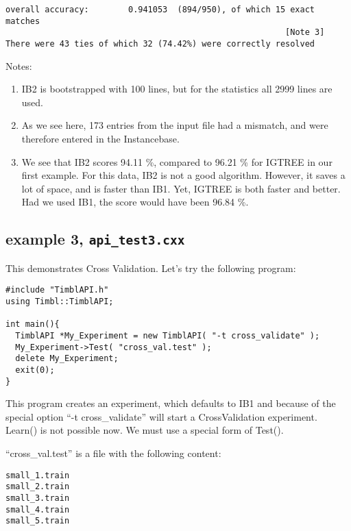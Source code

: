 \documentclass{report}
\begin{document}
\begin{footnotesize}
\begin{verbatim}
overall accuracy:        0.941053  (894/950), of which 15 exact matches 
                                                         [Note 3]
There were 43 ties of which 32 (74.42%) were correctly resolved
\end{verbatim}
\end{footnotesize}


Notes:
\begin{enumerate}
\item IB2 is bootstrapped with 100 lines, but for the statistics all 2999
 lines are used.
\item As we see here, 173 entries from the input file had a mismatch,
and were therefore entered in the Instancebase.
\item We see that IB2 scores 94.11 \%, compared to 96.21 \% for IGTREE
  in our first example.  For this data, IB2 is not a good
  algorithm. However, it saves a lot of space, and is faster than
  IB1. Yet, IGTREE is both faster and better. Had we used IB1, the
  score would have been 96.84 \%.
\end{enumerate}
\clearpage

\subsection{example 3, {\tt api\_test3.cxx}}

This demonstrates Cross Validation. Let's try the following program:

\begin{footnotesize}
\begin{verbatim}
#include "TimblAPI.h"
using Timbl::TimblAPI;

int main(){
  TimblAPI *My_Experiment = new TimblAPI( "-t cross_validate" );
  My_Experiment->Test( "cross_val.test" );  
  delete My_Experiment;
  exit(0);
}
\end{verbatim}
\end{footnotesize}

This program creates an experiment, which defaults to IB1 and because of the
special option ``-t cross\_validate'' will start a CrossValidation
experiment.\\
Learn() is not possible now. We must use a special form of Test().

``cross\_val.test'' is a file with the following content:
\begin{footnotesize}
\begin{verbatim}
small_1.train
small_2.train
small_3.train
small_4.train
small_5.train
\end{verbatim}
\end{footnotesize}
\end{document}
